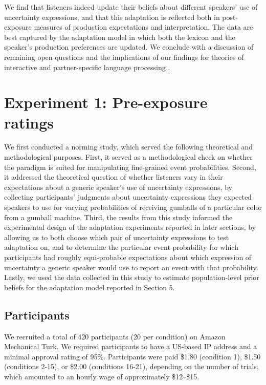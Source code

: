 \documentclass[man, floatsintext]{apa6}
\begin{document}
We find that listeners indeed update their beliefs about different  speakers' use of uncertainty expressions, and that this adaptation is reflected both in post-exposure measures of production expectations and interpretation. The data are best captured by the adaptation model in which both the lexicon and the speaker's production preferences are updated. We conclude with a discussion of remaining open questions and the implications of our findings for theories
of interactive  \parencite[e.g.,][]{Pickering2004,Pickering2013} and partner-specific language processing \parencite[e.g.,][]{Metzing2003,Horton2005,Horton2016}.

\section{Experiment 1: Pre-exposure ratings}
\label{sec:exp-norming}

We first conducted a norming study, which served the following theoretical and methodological purposes.
First, it served as a methodological check on whether the paradigm is suited for 
manipulating fine-grained event probabilities. 
Second, it addressed the theoretical question of whether listeners vary in their expectations about
a generic speaker's use of uncertainty expressions, by collecting participants' judgments about 
uncertainty expressions they expected speakers to use for varying probabilities of receiving gumballs of a particular color from a gumball machine. 
Third,  the results from this study informed the experimental design of the adaptation experiments 
reported in later sections, by allowing us to both choose which pair of uncertainty expressions to test adaptation on, 
and to determine the particular event probability for which participants had roughly equi-probable expectations 
about which expression of uncertainty a generic speaker would use to report an event with that probability. 
Lastly, we used the data collected in this study to 
estimate population-level prior beliefs for the adaptation model reported in Section 5.

\subsection{Participants}
We recruited a total of 420 participants 
(20 per condition) on Amazon Mechanical Turk. 
We required participants to have a US-based IP address and a minimal approval rating of 95\%.
Participants were paid \$1.80 (condition 1), \$1.50 (conditions 2-15),
or \$2.00 (conditions 16-21),
depending on the number of trials,
which amounted to an hourly wage of approximately \$12--\$15. 
\end{document}
